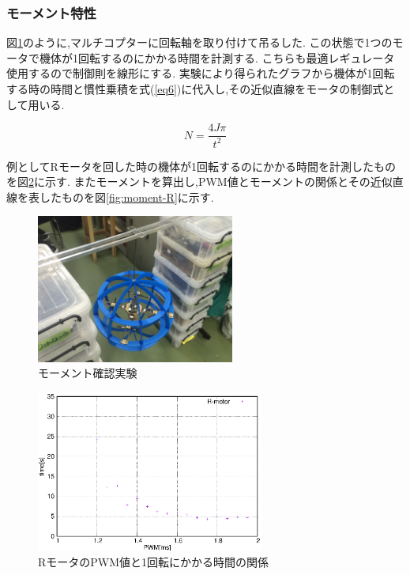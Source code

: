 \documentclass[12pt,oneside]{sotsuken_paper}
\begin{document}
\subsubsection{モーメント特性}
図\ref{fig:moment-test}のように,マルチコプターに回転軸を取り付けて吊るした.
この状態で1つのモータで機体が1回転するのにかかる時間を計測する.
こちらも最適レギュレータ使用するので制御則を線形にする.
実験により得られたグラフから機体が1回転する時の時間と慣性乗積を式(\ref{eq6})に代入し,その近似直線をモータの制御式として用いる.

\begin{equation}
	N = \frac{4J\pi}{t^2}
	\label{eq6}
\end{equation}
 


例としてRモータを回した時の機体が1回転するのにかかる時間を計測したものを図\ref{fig:moment-time-R}に示す.
またモーメントを算出し,PWM値とモーメントの関係とその近似直線を表したものを図\ref{fig:moment-R}に示す.

\begin{figure}[htbp]
	\begin{center}
		\includegraphics[width=65mm]{image/moment/moment-test.jpg}
		\caption{モーメント確認実験}
		\label{fig:moment-test}
	\end{center}
\end{figure}

\begin{figure}[htbp]
	\begin{center}
		\includegraphics[width=75mm]{image/moment/moment-time-R.eps}
		\caption{RモータのPWM値と1回転にかかる時間の関係}
		\label{fig:moment-time-R}
	\end{center}
\end{figure}
\end{document}
